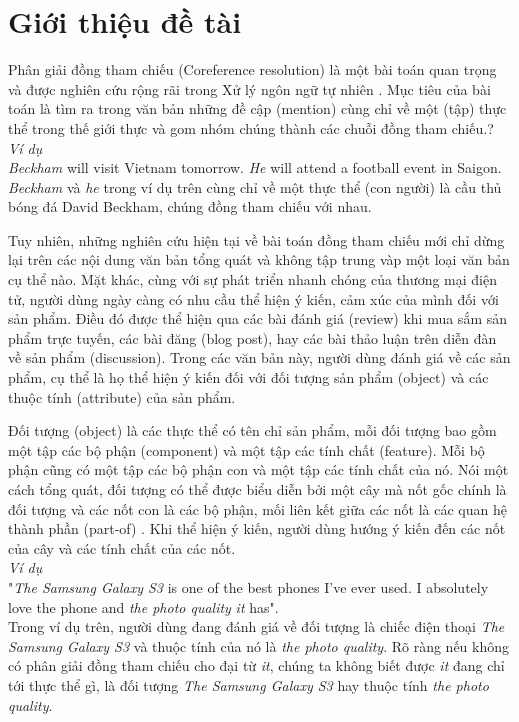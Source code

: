 \documentclass[12pt]{extarticle}
\begin{document}
	\section{Giới thiệu đề tài}	
		\par Phân giải đồng tham chiếu (Coreference resolution) là một bài toán quan trọng và được nghiên cứu rộng rãi trong Xử lý ngôn ngữ tự nhiên \cite{mainpaper}. Mục tiêu của bài toán là tìm ra trong văn bản những đề cập (mention) cùng chỉ về một (tập) thực thể trong thế giới thực và gom nhóm chúng thành các chuỗi đồng tham chiếu.?\\
		\textit{Ví dụ}\\
		\textit{Beckham} will visit Vietnam tomorrow. \textit{He} will attend a football event in Saigon.\\
		\textit{Beckham} và \textit{he} trong ví dụ trên cùng chỉ về một thực thể (con người) là cầu thủ bóng đá David Beckham, chúng đồng tham chiếu với nhau.
		\par Tuy nhiên, những nghiên cứu hiện tại về bài toán đồng tham chiếu mới chỉ dừng lại trên các nội dung văn bản tổng quát và không tập trung vàp một loại văn bản cụ thể nào. Mặt khác, cùng với sự phát triển nhanh chóng của thương mại điện tử, người dùng ngày càng có nhu cầu thể hiện ý kiến, cảm xúc của mình đối với sản phẩm. Điều đó được thể hiện qua các bài đánh giá (review) khi mua sắm sản phẩm trực tuyến, các bài đăng (blog post), hay các bài thảo luận trên diễn đàn về sản phẩm (discussion). Trong các văn bản này, người dùng đánh giá về các sản phẩm, cụ thể là họ thể hiện ý kiến đối với đối tượng sản phẩm (object) và các thuộc tính (attribute) của sản phẩm. 
		\par Đối tượng (object) là các thực thể có tên chỉ sản phẩm, mỗi đối tượng bao gồm một tập các bộ phận (component) và một tập các tính chất (feature). Mỗi bộ phận cũng có một tập các bộ phận con và một tập các tính chất của nó. Nói một cách tổng quát, đối tượng có thể được biểu diễn bởi một cây mà nốt gốc chính là đối tượng và các nốt con là các bộ phận, mối liên kết giữa các nốt là các quan hệ thành phần (part-of) \cite{sentiment}. Khi thể hiện ý kiến, người dùng hướng ý kiến đến các nốt của cây và các tính chất của các nốt.\\
		\textit{Ví dụ}\\
		"\textit{The Samsung Galaxy S3} is one of the best phones I've ever used. I absolutely love the phone and \textit{the photo quality} \textit{it} has".\\
		Trong ví dụ trên, người dùng đang đánh giá về đối tượng là chiếc điện thoại \textit{The Samsung Galaxy S3} và thuộc tính của nó là \textit{the photo quality}. Rõ ràng nếu không có phân giải đồng tham chiếu cho đại từ \textit{it}, chúng ta không biết được \textit{it} đang chỉ tới thực thể gì, là đối tượng \textit{The Samsung Galaxy S3} hay thuộc tính \textit{the photo quality}.\\
\end{document}
